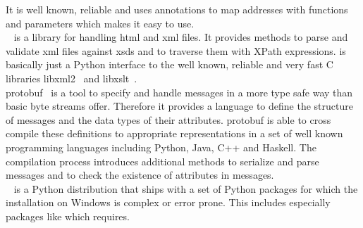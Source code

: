 It is well known, reliable and uses annotations to map addresses with functions and parameters which makes it easy to use.\\
\lxml{}~\cite{lxml} is a library for handling \gls{html} and \gls{xml} files.
It provides methods to parse and validate \gls{xml} files against \glspl{xsd} and to traverse them with XPath expressions.
\lxml{} is basically just a Python interface to the well known, reliable and very fast C libraries libxml2~\cite{libxml2} and libxslt~\cite{libxslt}.\\
\Gls{protobuf}~\cite{protobuf} is a tool to specify and handle messages in a more type safe way than basic byte streams offer.
Therefore it provides a language to define the structure of messages and the data types of their attributes.
\Gls{protobuf} is able to cross compile these definitions to appropriate representations in a set of well known programming languages including Python, Java, C++ and Haskell.
The compilation process introduces additional methods to serialize and parse messages and to check the existence of attributes in messages.\\
\winpython{}~\cite{winpython} is a Python distribution that ships with a set of Python packages for which the installation on Windows is complex or error prone.
This includes especially packages like \scipy{} which \drivebuild{} requires.
